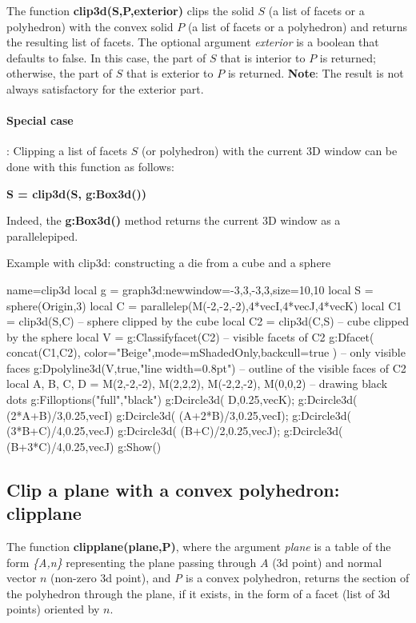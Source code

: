 The function \textbf{clip3d(S,P,exterior)} clips the solid $S$ (a list of facets or a polyhedron) with the convex solid $P$ (a list of facets or a polyhedron) and returns the resulting list of facets. The optional argument \emph{exterior} is a boolean that defaults to false. In this case, the part of $S$ that is interior to $P$ is returned; otherwise, the part of $S$ that is exterior to $P$ is returned.
\textbf{Note}: The result is not always satisfactory for the exterior part.

\paragraph{Special case}: Clipping a list of facets $S$ (or polyhedron) with the current 3D window can be done with this function as follows:

\begin{center}
\textbf{S = clip3d(S, g:Box3d())}
\end{center}

Indeed, the \textbf{g:Box3d()} method returns the current 3D window as a parallelepiped.

\begin{demo}[clip3d]{Example with clip3d: constructing a die from a cube and a sphere}
\begin{luadraw}{name=clip3d}
local g = graph3d:new{window={-3,3,-3,3},size={10,10}}
local S = sphere(Origin,3)
local C = parallelep(M(-2,-2,-2),4*vecI,4*vecJ,4*vecK)
local C1 = clip3d(S,C) -- sphere clipped by the cube
local C2 = clip3d(C,S) -- cube clipped by the sphere
local V = g:Classifyfacet(C2) -- visible facets of C2
g:Dfacet( concat(C1,C2), {color="Beige",mode=mShadedOnly,backcull=true} ) -- only visible faces
g:Dpolyline3d(V,true,"line width=0.8pt") -- outline of the visible faces of C2
local A, B, C, D = M(2,-2,-2), M(2,2,2), M(-2,2,-2), M(0,0,2) -- drawing black dots
g:Filloptions("full","black")
g:Dcircle3d( D,0.25,vecK); g:Dcircle3d( (2*A+B)/3,0.25,vecI)
g:Dcircle3d( (A+2*B)/3,0.25,vecI); g:Dcircle3d( (3*B+C)/4,0.25,vecJ)
g:Dcircle3d( (B+C)/2,0.25,vecJ); g:Dcircle3d( (B+3*C)/4,0.25,vecJ)
g:Show()            
\end{luadraw}
\end{demo}

\subsection{Clip a plane with a convex polyhedron: clipplane}

The function \textbf{clipplane(plane,P)}, where the argument \emph{plane} is a table of the form \emph{\{A,n\}} representing the plane passing through $A$ (3d point) and normal vector $n$ (non-zero 3d point), and \emph{P} is a convex polyhedron, returns the section of the polyhedron through the plane, if it exists, in the form of a facet (list of 3d points) oriented by $n$.

